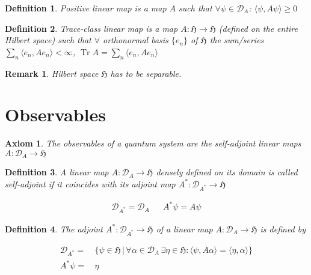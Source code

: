 \documentclass{article}
\newtheorem{axiom}{Axiom}
\newtheorem{definition}{Definition}
\newtheorem{remark}{Remark}
\DeclareMathOperator{\tr}{Tr}
\begin{document}
\begin{definition}
Positive linear map is a map $A$ such that $\forall\psi\in\mathcal{D}_A$: $\langle\psi, A\psi\rangle \geq 0$
\end{definition}

\begin{definition}
Trace-class linear map is a map $A:\mathfrak{H}\rightarrow\mathfrak{H}$ (defined on the entire Hilbert space) such that $\forall$ orthonormal basis $\{e_n\}$ of $\mathfrak{H}$ the sum/series $\sum_n \langle e_n, A e_n \rangle < \infty$, $\tr A = \sum_n \langle e_n, A e_n \rangle$
\end{definition}

\begin{remark}
Hilbert space $\mathfrak{H}$ has to be separable.
\end{remark}

\section{Observables}

\begin{axiom}
The observables of a quantum system are the self-adjoint linear maps $A:\mathcal{D}_A\longrightarrow\mathfrak{H}$
\end{axiom}

\begin{definition}
A linear map $A:\mathcal{D}_A\longrightarrow\mathfrak{H}$ densely defined on its domain is called self-adjoint if it coincides with its adjoint map $A^{*}:\mathcal{D}_{A^{*}}\longrightarrow\mathfrak{H}$
\end{definition}

\begin{align*}
\mathcal{D}_{A^{*}} = \mathcal{D}_A & & A^{*}\psi = A\psi
\end{align*}

\begin{definition}
The adjoint $A^{*}:\mathcal{D}_{A^{*}}\longrightarrow\mathfrak{H}$ of a linear map $A:\mathcal{D}_A\longrightarrow\mathfrak{H}$ is defined by

\begin{align*}
\mathcal{D}_{A^{*}} = & \,\Big\{ \psi \in \mathfrak{H} \,\Big\vert\, \forall\alpha\in\mathcal{D}_A \,\exists\eta\in\mathfrak{H}: \langle\psi,A\alpha\rangle = \langle\eta,\alpha\rangle \Big\} \\
A^{*}\psi = & \,\eta
\end{align*}

\end{definition}
\end{document}
